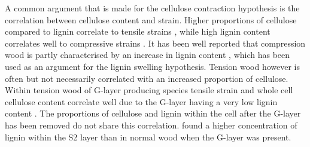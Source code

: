 A common argument that is made for the cellulose contraction hypothesis is the
correlation between cellulose content and strain. Higher proportions of
cellulose compared to lignin correlate to tensile strains \citep{Sugiyama_1993,Qiu_2008,Yang_2006}, while high lignin
content correlates well to compressive strains \citep{ISI:A1991FD97000001,Okuyama_1998}. It has been well
reported that compression wood is partly characterised by an increase in
lignin content \citep{timell1986compression}, which has been used as an argument for the lignin
swelling hypothesis. Tension wood however is often but not necessarily
correlated with an increased proportion of cellulose.%
Within tension wood of G-layer producing species tensile
strain and whole cell cellulose content correlate well due to the G-layer
having a very low lignin content \citep{gardiner2014biology}. The proportions of cellulose and lignin
within the cell after the G-layer has been removed do not share this correlation. \citet{timell1969chemical} found a higher concentration of lignin within the S2 layer than in normal wood when the G-layer was present. 
